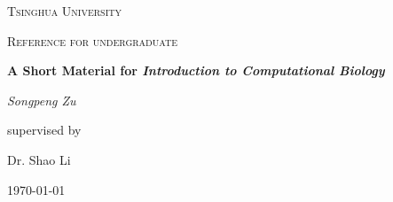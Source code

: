 \documentclass[12pt,a4paper]{book}
\begin{document}
\begin{titlepage}
        \centering
        {\scshape\LARGE Tsinghua University \par}
        \vspace{1cm}
        {\scshape\Large Reference for undergraduate\par}
        \vspace{1.5cm}
        {\huge\bfseries A Short Material for \textit{Introduction to Computational Biology}\par}
        \vspace{2cm}
        {\Large\itshape Songpeng Zu\par}
        \vfill
        supervised by\par
        Dr. Shao Li
        \vfill
        {\large \today\par}
\end{titlepage}
\end{document}
